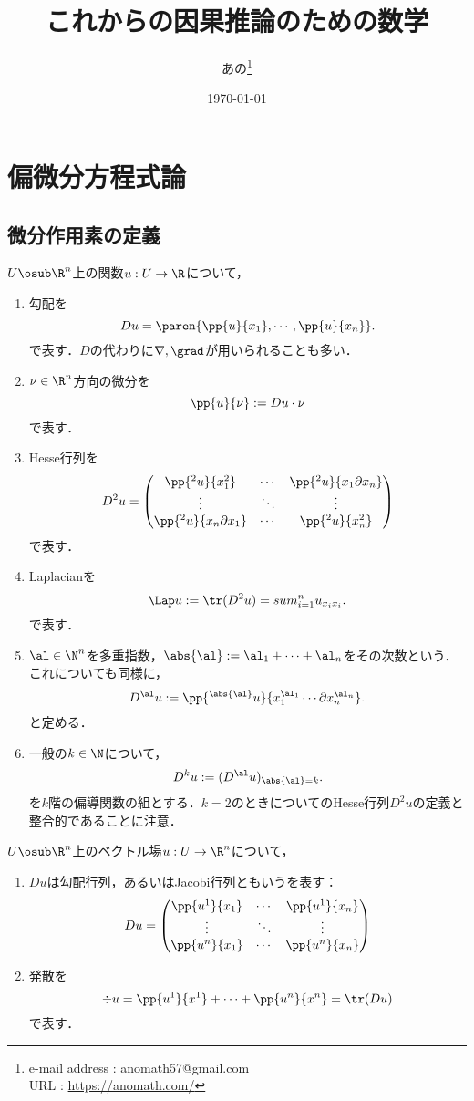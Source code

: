 \documentclass[uplatex,dvipdfmx]{jsreport}
\title{これからの因果推論のための数学}
\author{あの\footnote{e-mail address : anomath57@gmail.com\\URL : \url{https://anomath.com/}}}
\date{\today}
\begin{document}
\tableofcontents

\chapter{偏微分方程式論}

\section{微分作用素の定義}

\begin{definition}[関数に対する微分]
    $U\osub\R^n$上の関数$u:U\to\R$について，
    \begin{enumerate}
        \item 勾配を
        \[Du=\paren{\pp{u}{x_1},\cdots,\pp{u}{x_n}}.\]
        で表す．$D$の代わりに$\nabla,\grad$が用いられることも多い．
        \item $\nu\in\R^n$方向の微分を
        \[\pp{u}{\nu}:=Du\cdot\nu\]
        で表す．
        \item Hesse行列を
        \[D^2u=\begin{pmatrix}\pp{^2u}{x_1^2}&\cdots&\pp{^2u}{x_1\partial x_n}\\\vdots&\ddots&\vdots\\\pp{^2u}{x_n\partial x_1}&\cdots&\pp{^2u}{x_n^2}\end{pmatrix}\]
        で表す．
        \item Laplacianを
        \[\Lap u:=\tr(D^2u)=sum_{i=1}^nu_{x_ix_i}.\]
        で表す．
        \item $\al\in\N^n$を多重指数，$\abs{\al}:=\al_1+\cdots+\al_n$をその次数という．これについても同様に，
        \[D^\al u:=\pp{^{\abs{\al}}u}{x_1^{\al_1}\cdots\partial x^{\al_n}_n}.\]
        と定める．
        \item 一般の$k\in\N$について，
        \[D^ku:=(D^\al u)_{\abs{\al}=k}.\]
        を$k$階の偏導関数の組とする．$k=2$のときについてのHesse行列$D^2u$の定義と整合的であることに注意．
    \end{enumerate}
\end{definition}

\begin{definition}[ベクトル場に対する微分]
    $U\osub\R^n$上のベクトル場$u:U\to\R^n$について，
    \begin{enumerate}
        \item $Du$は勾配行列，あるいはJacobi行列ともいうを表す：
        \[Du=\begin{pmatrix}\pp{u^1}{x_1}&\cdots&\pp{u^1}{x_n}\\\vdots&\ddots&\vdots\\\pp{u^n}{x_1}&\cdots&\pp{u^n}{x_n}\end{pmatrix}\]
        \item 発散を
        \[\div u=\pp{u^1}{x^1}+\cdots+\pp{u^n}{x^n}=\tr(Du)\]
        で表す．
    \end{enumerate}
\end{definition}
\end{document}
